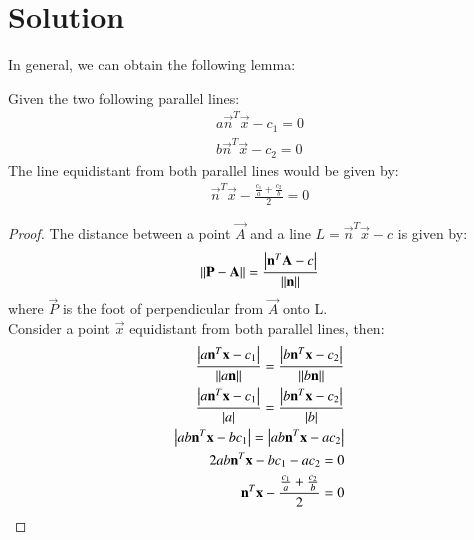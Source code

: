 \documentclass[journal,12pt,twocolumn]{IEEEtran}
\begin{document}
\section{Solution}
In general, we can obtain the following lemma:
\begin{lemma}
Given the two following parallel lines:
\begin{align}
    a\vec{n}^T\vec{x} - c_1 = 0\\
    b\vec{n}^T\vec{x} - c_2 = 0
\end{align}
The line equidistant from both parallel lines would be given by:
\begin{align}
    \vec{n}^T\vec{x} - \frac{\frac{c_1}{a} + \frac{c_2}{b}}{2} = 0
\end{align}
\end{lemma}
\begin{proof}
The distance between a point $\vec{A}$ and a line $L = \vec{n}^T\vec{x} - c$ is given by:
\begin{align}
    \left\lVert\mathbf{P} - \mathbf{A}\right\rVert = \frac{\left\vert\mathbf{n}^T \mathbf{A} - c\right\vert}{\left\lVert\mathbf{n}\right\rVert}
\end{align}
where $\vec{P}$ is the foot of perpendicular from $\vec{A}$ onto L.\\
Consider a point $\vec{x}$ equidistant from both parallel lines, then:
\begin{align}
    \frac{\left\vert a\mathbf{n}^T\mathbf{x} - c_1\right\vert}{\left\lVert a\mathbf{n}\right\rVert} = 
    \frac{\left\vert b\mathbf{n}^T\mathbf{x} - c_2\right\vert}{\left\lVert b\mathbf{n}\right\rVert}\\
      \frac{\left\vert a\mathbf{n}^T\mathbf{x} - c_1\right\vert}{\left\vert a\right\vert} = 
    \frac{\left\vert b\mathbf{n}^T\mathbf{x} - c_2\right\vert}{\left\vert b\right\vert}\\
      \left\vert ab\mathbf{n}^T\mathbf{x} - bc_1\right\vert = \left\vert ab\mathbf{n}^T\mathbf{x} - ac_2\right\vert\\
      2ab\mathbf{n}^T\mathbf{x} - bc_1 - ac_2 = 0\\
       \mathbf{n}^T\mathbf{x} - \frac{\frac{c_1}{a} + \frac{c_2}{b}}{2} = 0
\end{align}
\end{proof}
\end{document}
